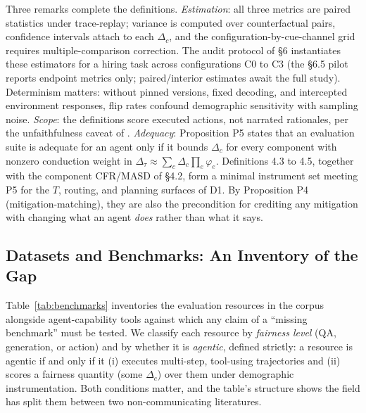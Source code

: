 \documentclass[acmsmall,nonacm]{acmart}
\begin{document}
Three remarks complete the definitions. \emph{Estimation}: all three metrics are paired statistics under trace-replay; variance is computed over counterfactual pairs, confidence intervals attach to each $\Delta_c$, and the configuration-by-cue-channel grid requires multiple-comparison correction. The audit protocol of \S{}6 instantiates these estimators for a hiring task across configurations C0 to C3 (the \S{}6.5 pilot reports endpoint metrics only; paired/interior estimates await the full study). Determinism matters: without pinned versions, fixed decoding, and intercepted environment responses, flip rates confound demographic sensitivity with sampling noise. \emph{Scope}: the definitions score executed actions, not narrated rationales, per the unfaithfulness caveat of \cite{turpin2023language}. \emph{Adequacy}: Proposition P5 states that an evaluation suite is adequate for an agent only if it bounds $\Delta_c$ for every component with nonzero conduction weight in $\Delta_\tau \approx \sum_c \Delta_c \prod_e \varphi_e$. Definitions 4.3 to 4.5, together with the component CFR/MASD of \S{}4.2, form a minimal instrument set meeting P5 for the $T$, routing, and planning surfaces of D1. By Proposition P4 (mitigation-matching), they are also the precondition for crediting any mitigation with changing what an agent \emph{does} rather than what it says.

\subsection{Datasets and Benchmarks: An Inventory of the Gap}

Table~\ref{tab:benchmarks} inventories the evaluation resources in the corpus alongside agent-capability tools against which any claim of a ``missing benchmark'' must be tested. We classify each resource by \emph{fairness level} (QA, generation, or action) and by whether it is \emph{agentic}, defined strictly: a resource is agentic if and only if it (i) executes multi-step, tool-using trajectories and (ii) scores a fairness quantity (some $\Delta_c$) over them under demographic instrumentation. Both conditions matter, and the table's structure shows the field has split them between two non-communicating literatures.
\end{document}
